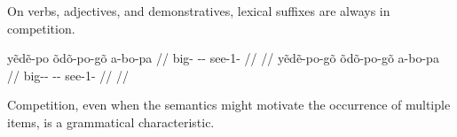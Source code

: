 \documentclass{beamer}
\begin{document}

  
\begin{frame}{On verbs, adjectives, and demonstratives, lexical suffixes are always in competition.}

  \pex
  \a\begingl
  \gla yẽdẽ-po õdõ-po-gõ a-bo-pa //
  \glb big- -- see-1- //
  \glft {} //
  \endgl
  \a\ljudge{*}\begingl
  \gla yẽdẽ-po-gõ õdõ-po-gõ a-bo-pa //
  \glb big-- -- see-1- //
  \glft {} //
  \endgl
  \xe

  Competition, even when the semantics might motivate the occurrence of multiple items, is a grammatical characteristic.

\end{frame}




  
  


\end{document}
